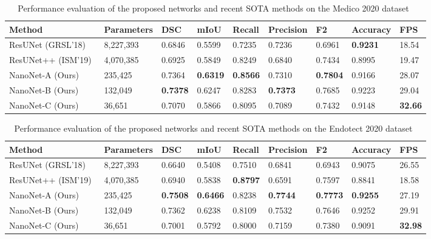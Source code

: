 \documentclass[journal]{IEEEtran}
\begin{document}
\begin{table*}[!t]
\centering
\caption{Performance evaluation of the proposed networks and recent \ac{SOTA} methods on the Medico 2020 dataset~\cite{jha2020medico}}
\footnotesize
\begin{tabular}{l|l|l|l|l|l|l|l|l}
\toprule
\textbf{Method}&\textbf{Parameters} & \textbf{DSC} & \textbf{mIoU} & \textbf{Recall} & \textbf{Precision}& \textbf{F2} & \textbf{Accuracy} &\textbf{FPS} \\ \hline



ResUNet (GRSL'18)~\cite{zhang2018road} & 8,227,393 &0.6846 &0.5599 &0.7235 &0.7236 &0.6961 &\textbf{0.9231} & 18.54 \\ 

ResUNet++ (ISM'19)~\cite{jha2019resunet++} & 4,070,385 &0.6925 &0.5849 &0.8249 &0.6840 &0.7434 &0.8995 & 19.47 \\ 

NanoNet-A (Ours)&235,425 &0.7364 &\textbf{0.6319}  &\textbf{0.8566} &0.7310 &\textbf{0.7804} &0.9166 &28.07\\ NanoNet-B (Ours)&132,049  &\textbf{0.7378} &0.6247 &0.8283  &\textbf{0.7373} &0.7685 &0.9223 &29.04\\ NanoNet-C (Ours)&36,651 & 0.7070 &0.5866  &0.8095  &0.7089 &0.7432 &0.9148 &\textbf{32.66}\\ 
\bottomrule
\end{tabular}
\label{tab:resultMedico2020}
\end{table*}
\begin{table*}[!t]
\centering
\caption{Performance evaluation of the proposed networks and recent \ac{SOTA} methods on the Endotect 2020 dataset~\cite{hicksendotect}}
\footnotesize
\begin{tabular}{l|l|l|l|l|l|l|l|l}
\toprule
\textbf{Method} &\textbf{Parameters} & \textbf{DSC} & \textbf{mIoU} & \textbf{Recall} & \textbf{Precision}& \textbf{F2} & \textbf{Accuracy} &\textbf{FPS} \\ \hline



ResUNet (GRSL'18)~\cite{ronneberger2015u} & 8,227,393 &0.6640 &0.5408 &0.7510 &0.6841 &0.6943 &0.9075 & 26.55 \\ 

ResUNet++ (ISM'19)~\cite{jha2019resunet++} & 4,070,385 &0.6940 &0.5838 &\textbf{0.8797} &0.6591 &0.7597 &0.8841  &18.58 \\

NanoNet-A (Ours) & 235,425 &\textbf{0.7508} &\textbf{0.6466} &0.8238 &\textbf{0.7744} &\textbf{0.7773} &\textbf{0.9255} & 27.19 \\ NanoNet-B (Ours) & 132,049 &0.7362 &0.6238 &0.8109 &0.7532 &0.7646 &0.9252 & 29.91\\ NanoNet-C (Ours)&  36,651 &0.7001 &0.5792 &0.8000 &0.7159 &0.7380 &0.9091 & \textbf{32.98}\\ 
\bottomrule
\end{tabular}
\label{tab:resultEndotect2020}
\end{table*}
\end{document}
